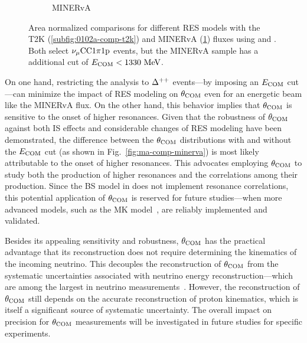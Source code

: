 \begin{figure}
\begin{subfigure}[b]{\dbfigwid\textwidth}
          \caption{MINERvA}
          \label{subfig:0102a-comp-minerva}
     \end{subfigure}
     \caption{Area normalized comparisons for different RES models with the T2K (\ref{subfig:0102a-comp-t2k}) and MINERvA (\ref{subfig:0102a-comp-minerva}) fluxes using \geoa and \getwoa.
     Both select $\nu_{\mu}\textrm{CC}1\pi1\textrm{p}$ events, but the MINERvA sample has a additional cut of $E_{\textrm{COM}}<1330~\textrm{MeV}$.}
     \label{fig:0102a-comp}
     \end{figure}

     On one hand, restricting the analysis to $\Delta^{++}$ events—by imposing an $E_{\textrm{COM}}$ cut—can minimize the impact of RES modeling on $\theta_{\textrm{COM}}$ even for an energetic beam like the MINERvA flux.
     On the other hand, this behavior implies that $\theta_{\textrm{COM}}$ is sensitive to the onset of higher resonances.
     Given that the robustness of $\theta_{\textrm{COM}}$ against both IS effects and considerable changes of RES modeling have been demonstrated, the difference between the $\theta_{\textrm{COM}}$ distributions with and without the $E_{\textrm{COM}}$ cut (as shown in Fig.~\ref{fig:ma-comp-minerva}) is most likely attributable to the onset of higher resonances.
     This advocates employing $\theta_{\textrm{COM}}$ to study both the production of higher resonances and the correlations among their production.
     Since the BS model in \genie does not implement resonance correlations, this potential application of $\theta_{\textrm{COM}}$ is reserved for future studies—when more advanced models, such as the MK model~\cite{Kabirnezhad:2017jmf,Kabirnezhad:2020wtp,Kabirnezhad:2022znc}, are reliably implemented and validated.

     Besides its appealing sensitivity and robustness, $\theta_{\textrm{COM}}$ has the practical advantage that its reconstruction does not require determining the kinematics of the incoming neutrino.
     This decouples the reconstruction of $\theta_{\textrm{COM}}$ from the systematic uncertainties associated with neutrino energy reconstruction—which are among the largest in neutrino measurements~\cite{T2K:2019yqu,T2K:2021naz,MicroBooNECollaboration:2024gvg,NOvA:2023uxq,MINERvA:2022djk}.
     However, the reconstruction of $\theta_{\textrm{COM}}$ still depends on the accurate reconstruction of proton kinematics, which is itself a significant source of systematic uncertainty.
     The overall impact on precision for $\theta_{\textrm{COM}}$ measurements will be investigated in future studies for specific experiments.

